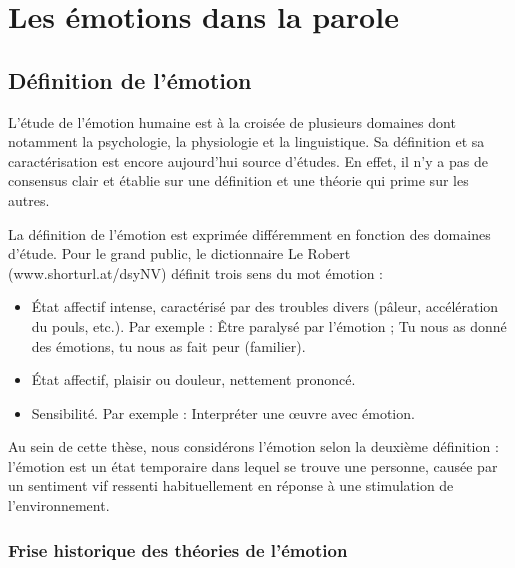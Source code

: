 \clearemptydoublepage

\chapter{Les émotions dans la parole}

 \section{Définition de l'émotion}
L'étude de l'émotion humaine est à la croisée de plusieurs domaines dont notamment la psychologie, la physiologie et la linguistique. Sa définition et sa caractérisation est encore aujourd'hui source d'études. En effet, il n'y a pas de consensus clair et établie sur une définition et une théorie qui prime sur les autres.

La définition de l'émotion est exprimée différemment en fonction des domaines d'étude. Pour le grand public, le dictionnaire Le Robert (www.shorturl.at/dsyNV) définit trois sens du mot émotion :
\begin{itemize}
    \item État affectif intense, caractérisé par des troubles divers (pâleur, accélération du pouls, etc.). Par exemple : Être paralysé par l'émotion ; Tu nous as donné des émotions, tu nous as fait peur (familier).
    \item État affectif, plaisir ou douleur, nettement prononcé.
    \item Sensibilité. Par exemple : Interpréter une œuvre avec émotion.
\end{itemize}
Au sein de cette thèse, nous considérons l'émotion selon la deuxième définition : l'émotion est un état temporaire dans lequel se trouve une personne, causée par un sentiment vif ressenti habituellement en réponse à une stimulation de l'environnement.

\subsection{Frise historique des théories de l'émotion}



